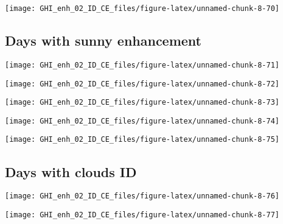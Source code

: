 \documentclass[
  10pt,
  a4paper,oneside]{article}
\begin{document}
\begin{center}\texttt{[image: GHI\_enh\_02\_ID\_CE\_files/figure-latex/unnamed-chunk-8-70]} \end{center}

\FloatBarrier

\hypertarget{days-with-sunny-enhancement}{%
\subsection{Days with sunny enhancement}\label{days-with-sunny-enhancement}}

\begin{center}\texttt{[image: GHI\_enh\_02\_ID\_CE\_files/figure-latex/unnamed-chunk-8-71]} \end{center}

\begin{center}\texttt{[image: GHI\_enh\_02\_ID\_CE\_files/figure-latex/unnamed-chunk-8-72]} \end{center}

\begin{center}\texttt{[image: GHI\_enh\_02\_ID\_CE\_files/figure-latex/unnamed-chunk-8-73]} \end{center}

\begin{center}\texttt{[image: GHI\_enh\_02\_ID\_CE\_files/figure-latex/unnamed-chunk-8-74]} \end{center}

\begin{center}\texttt{[image: GHI\_enh\_02\_ID\_CE\_files/figure-latex/unnamed-chunk-8-75]} \end{center}

\FloatBarrier

\hypertarget{days-with-clouds-id}{%
\subsection{Days with clouds ID}\label{days-with-clouds-id}}

\begin{center}\texttt{[image: GHI\_enh\_02\_ID\_CE\_files/figure-latex/unnamed-chunk-8-76]} \end{center}

\begin{center}\texttt{[image: GHI\_enh\_02\_ID\_CE\_files/figure-latex/unnamed-chunk-8-77]} \end{center}
\end{document}
